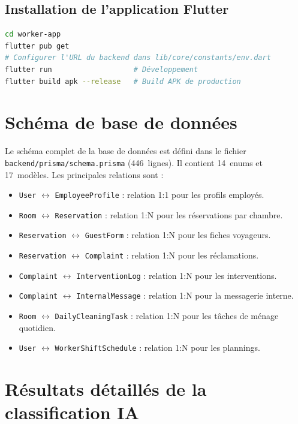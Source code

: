 \subsection{Installation de l'application Flutter}
\begin{lstlisting}[language=bash,caption={Installation de l'application Flutter}]
cd worker-app
flutter pub get
# Configurer l'URL du backend dans lib/core/constants/env.dart
flutter run                   # Développement
flutter build apk --release   # Build APK de production
\end{lstlisting}


\section{Schéma de base de données}
\label{sec:schema_bdd}
Le schéma complet de la base de données est défini dans le fichier \texttt{backend/prisma/schema.prisma} (446~lignes). Il contient 14~enums et 17~modèles. Les principales relations sont :
\begin{itemize}
    \item \texttt{User} $\leftrightarrow$ \texttt{EmployeeProfile} : relation 1:1 pour les profils employés.
    \item \texttt{Room} $\leftrightarrow$ \texttt{Reservation} : relation 1:N pour les réservations par chambre.
    \item \texttt{Reservation} $\leftrightarrow$ \texttt{GuestForm} : relation 1:N pour les fiches voyageurs.
    \item \texttt{Reservation} $\leftrightarrow$ \texttt{Complaint} : relation 1:N pour les réclamations.
    \item \texttt{Complaint} $\leftrightarrow$ \texttt{InterventionLog} : relation 1:N pour les interventions.
    \item \texttt{Complaint} $\leftrightarrow$ \texttt{InternalMessage} : relation 1:N pour la messagerie interne.
    \item \texttt{Room} $\leftrightarrow$ \texttt{DailyCleaningTask} : relation 1:N pour les tâches de ménage quotidien.
    \item \texttt{User} $\leftrightarrow$ \texttt{WorkerShiftSchedule} : relation 1:N pour les plannings.
\end{itemize}


\section{Résultats détaillés de la classification IA}
\label{sec:resultats_ia}

